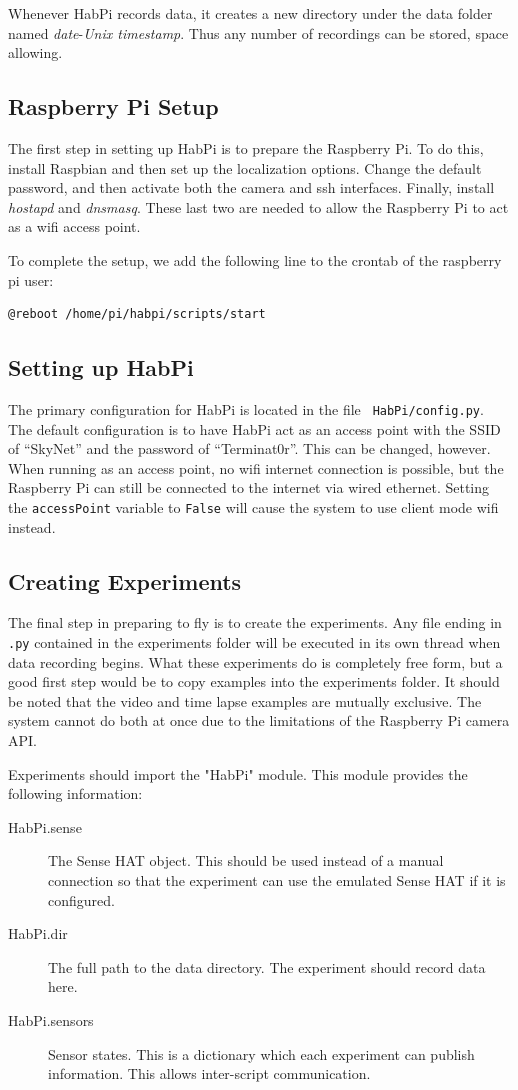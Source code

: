 \documentclass[journal]{new-aiaa}
\begin{document}
Whenever HabPi records data, it creates a new directory under the
data folder named {\em date}-{\em Unix timestamp}.  Thus any number of
recordings can be stored, space allowing.

\subsection{Raspberry Pi Setup}
The first step in setting up HabPi is to prepare the Raspberry Pi.
To do this, install Raspbian and then set up the localization options.
Change the default password, and then activate both the camera and ssh
interfaces.  Finally, install {\em hostapd} and {\em dnsmasq}.  These
last two are needed to allow the Raspberry Pi to act as a wifi access
point.

To complete the setup, we add the following line to the crontab of the
raspberry pi user:
\begin{verbatim}
@reboot /home/pi/habpi/scripts/start
\end{verbatim}

\subsection{Setting up HabPi}
The primary configuration for HabPi is located in the file {\tt
HabPi/config.py}.  The default configuration is to have HabPi act as
an access point with the SSID of ``SkyNet'' and the password of
``Terminat0r''. This can be changed, however.  When running as an
access point, no wifi internet connection is possible, but the Raspberry
Pi can still be connected to the internet via wired ethernet.
Setting the {\tt accessPoint} variable to {\tt False} will cause the
system to use client mode wifi instead.  

\subsection{Creating Experiments}
The final step in preparing to fly is to create the experiments.  Any
file ending in {\tt.py} contained in the experiments folder will be
executed in its own thread when data recording begins.  What these
experiments do is completely free form, but a good first step would be to
copy examples into the experiments folder.  It should be noted that
the video and time lapse examples are mutually exclusive.  The system
cannot do both at once due to the limitations of the Raspberry Pi
camera API.

Experiments should import the "HabPi" module.
This module provides the following information:
\begin{description}
    \item[HabPi.sense] The Sense HAT object.  This should be used
    instead of a manual connection so that the experiment can use the
    emulated Sense HAT if it is configured.
    \item[HabPi.dir] The full path to the data directory.  The
    experiment should record data here.
    \item[HabPi.sensors] Sensor states.  This is a dictionary which
    each experiment can publish information.  This allows inter-script
    communication.
\end{description}
\end{document}

